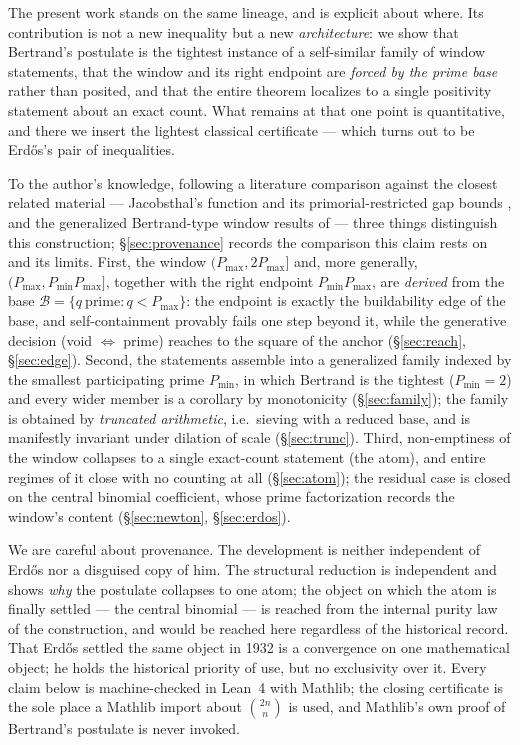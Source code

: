 \documentclass[11pt,a4paper]{amsart}
\theoremstyle{plain}
\theoremstyle{definition}
\theoremstyle{plain}
\theoremstyle{remark}
\begin{document}
The present work stands on the same lineage, and is explicit about where. Its
contribution is not a new inequality but a new \emph{architecture}: we show that
Bertrand's postulate is the tightest instance of a self-similar family of window
statements, that the window and its right endpoint are \emph{forced by the prime base}
rather than posited, and that the entire theorem localizes to a single positivity
statement about an exact count. What remains at that one point is quantitative, and there
we insert the lightest classical certificate --- which turns out to be Erd\H{o}s's pair of
inequalities.

To the author's knowledge, following a literature comparison against the closest related
material --- Jacobsthal's function and its primorial-restricted gap bounds
\cite{jacobsthal1961,iwaniec1978}, and the generalized Bertrand-type window results of
\cite{daspaul2019} --- three things distinguish this construction; \S\ref{sec:provenance}
records the comparison this claim rests on and its limits. First, the window $(P_{\max},2P_{\max}]$ and, more generally,
$(P_{\max},P_{\min}P_{\max}]$, together with the right endpoint $P_{\min}P_{\max}$, are
\emph{derived} from the base $\mathcal{B}=\{q\ \text{prime}: q<P_{\max}\}$: the endpoint
is exactly the buildability edge of the base, and self-containment provably fails one step
beyond it, while the generative decision (void $\Leftrightarrow$ prime) reaches to the square
of the anchor (\S\ref{sec:reach}, \S\ref{sec:edge}). Second, the statements assemble into a
generalized family indexed by the smallest participating prime $P_{\min}$, in which
Bertrand is the tightest ($P_{\min}=2$) and every wider member is a corollary by
monotonicity (\S\ref{sec:family}); the family is obtained by \emph{truncated arithmetic},
i.e.\ sieving with a reduced base, and is manifestly invariant under dilation of scale
(\S\ref{sec:trunc}). Third, non-emptiness of the window collapses to a single exact-count
statement (the atom), and entire regimes of it close with no counting at all
(\S\ref{sec:atom}); the residual case is closed on the central binomial coefficient, whose
prime factorization records the window's content (\S\ref{sec:newton}, \S\ref{sec:erdos}).

We are careful about provenance. The development is neither independent of Erd\H{o}s nor a
disguised copy of him. The structural reduction is independent and shows \emph{why} the
postulate collapses to one atom; the object on which the atom is finally settled --- the
central binomial --- is reached from the internal purity law of the construction, and
would be reached here regardless of the historical record. That Erd\H{o}s settled the same
object in 1932 is a convergence on one mathematical object; he holds the historical
priority of use, but no exclusivity over it. Every claim below is machine-checked in
Lean~4 with Mathlib; the closing certificate is the sole place a Mathlib import about
$\binom{2n}{n}$ is used, and Mathlib's own proof of Bertrand's postulate is never
invoked.
\end{document}
